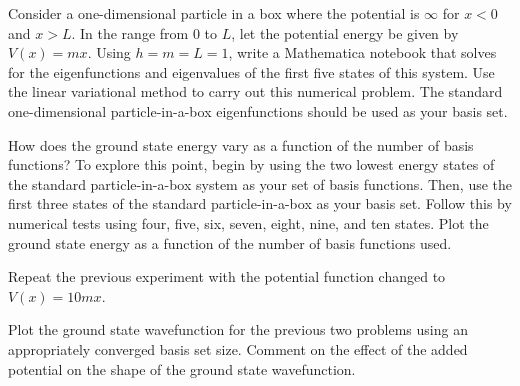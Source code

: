 %

\makeheaderfooter{}
\maketitle

%
\begin{problem1}
Consider a one-dimensional particle in a box where the potential is
$\infty$
for $x < {}0$ and $x > L$. In the range from $0$ to $L$, let the
potential energy be given by $V\left(x\right) = m x$. Using $h=m=L=1$,
write a Mathematica notebook that solves for the eigenfunctions and
eigenvalues of the first five states of this system. Use the linear variational
method to carry out this numerical problem. The standard one-dimensional
particle-in-a-box eigenfunctions should be used as your basis set.

\begin{subproblem1}
How does the ground state energy vary as a function of the number of basis
functions? To explore this point, begin by using the two lowest energy
states of the standard particle-in-a-box system as your set of basis
functions. Then, use the first three states of the standard
particle-in-a-box as your basis set. Follow this by numerical tests using
four, five, six, seven, eight, nine, and ten states. Plot the ground state
energy as a function of the number of basis functions used.
\end{subproblem1}

\begin{subproblem1}
Repeat the previous experiment with the potential function changed to
$V\left(x\right) = 10 m x$.
\end{subproblem1}

\begin{subproblem1}
Plot the ground state wavefunction for the previous two problems using an
appropriately converged basis set size. Comment on the effect of the added
potential on the shape of the ground state wavefunction.
\end{subproblem1}

\end{problem1}
%

